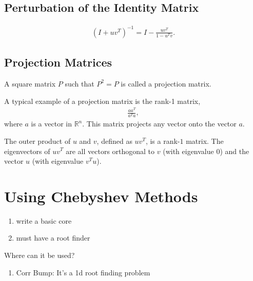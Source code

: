 \documentclass{amsart}
\theoremstyle{plain}
\numberwithin{equation}{section}
\begin{document}
\subsection*{Perturbation of the Identity Matrix}
\begin{align*}
\left(I + uv^T\right)^{-1} = I - \frac{uv^T}{1 - u^Tv}.
\end{align*}

\subsection*{Projection Matrices}
A square matrix $P$ such that $P^2=P$ is called
a projection matrix. 

A typical example of a projection matrix is the 
rank-1 matrix,
\begin{align*}
\frac{aa^T}{a^Ta},
\end{align*}
where $a$ is a vector in $\mathbb{R}^n$. This matrix projects
any vector onto the vector $a$. 

The outer product of $u$ and $v$, defined as $uv^T$, is a rank-$1$  matrix.
The eigenvectors of $uv^T$ are 
all vectors orthogonal to $v$ (with eigenvalue $0$) and the 
vector $u$ (with eigenvalue $v^Tu$).



\section{Using Chebyshev Methods}
\begin{enumerate}
\item write a basic core
\item must have a root finder
\end{enumerate}

Where can it be used?
\begin{enumerate}
\item Corr Bump: It's a 1d root finding problem
\end{enumerate}
\end{document}
